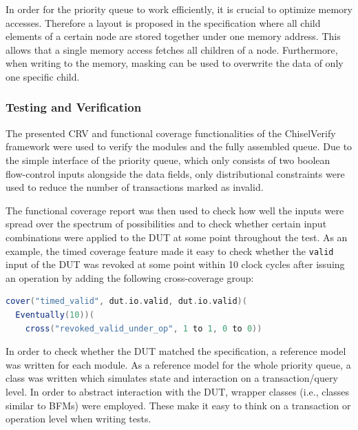 \documentclass[conference]{IEEEtran}
\begin{document}
In order for the priority queue to work efficiently, it is crucial to optimize memory accesses. 
Therefore a layout is proposed in the specification where all child elements of a certain node are stored together under one memory address. 
This allows that a single memory access fetches all children of a node. Furthermore, when writing to the memory, masking can be used to overwrite the data of only one specific child.

\subsubsection{Testing and Verification}

The presented CRV and functional coverage functionalities of the ChiselVerify framework were used to verify the modules and the fully assembled queue.
Due to the simple interface of the priority queue, which only consists of two boolean flow-control inputs alongside the data fields, only distributional constraints were used to reduce the number of transactions marked as invalid. 

The functional coverage report was then used to check how well the inputs were spread over the spectrum of possibilities and to check whether certain input combinations were applied to the DUT at some point throughout the test. 
As an example, the timed coverage feature made it easy to check whether the \texttt{valid} input of the DUT was revoked at some point within 10 clock cycles after issuing an operation by adding the following cross-coverage group:

\begin{lstlisting}[language=scala, caption={A timed cover construct.}, label={lst:timedcover}]
cover("timed_valid", dut.io.valid, dut.io.valid)(
  Eventually(10))(
    cross("revoked_valid_under_op", 1 to 1, 0 to 0))
\end{lstlisting}

In order to check whether the DUT matched the specification, a reference model was written for each module. 
As a reference model for the whole priority queue, a class was written which simulates state and interaction on a transaction/query level. In order to abstract interaction with the DUT, wrapper classes (i.e., classes similar to BFMs) were employed. 
These make it easy to think on a transaction or operation level when writing tests.
\end{document}
